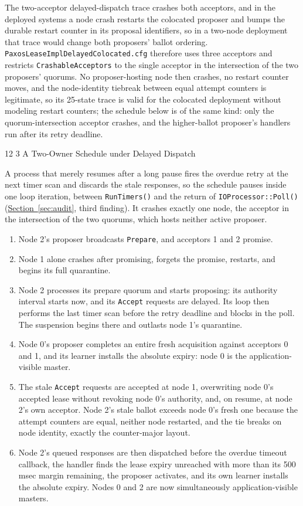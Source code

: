 \documentclass[final,5p,times,twocolumn,number]{elsarticle}
\makeatletter
\newcommand{\code}[1]{\texttt{#1}}
\newcommand{\secref}[1]{\hyperref[#1]{Section~\ref*{#1}}}
\renewcommand\subsection{\@startsection{subsection}{2}{\z@}%
           {12\p@ \@plus 6\p@ \@minus 3\p@}%
           {3\p@ \@plus 6\p@ \@minus 3\p@}%
           {\normalfont\normalsize\bfseries}}
\makeatother
\begin{document}
The two-acceptor delayed-dispatch trace crashes both acceptors, and in the deployed systems a node crash restarts the colocated proposer and bumps the durable restart counter in its proposal identifiers, so in a two-node deployment that trace would change both proposers' ballot ordering.  \code{PaxosLeaseImplDelayedColocated.cfg} therefore uses three acceptors and restricts \code{CrashableAcceptors} to the single acceptor in the intersection of the two proposers' quorums.  No proposer-hosting node then crashes, no restart counter moves, and the node-identity tiebreak between equal attempt counters is legitimate, so its 25-state trace is valid for the colocated deployment without modeling restart counters; the schedule below is of the same kind: only the quorum-intersection acceptor crashes, and the higher-ballot proposer's handlers run after its retry deadline.

\subsection{A Two-Owner Schedule under Delayed Dispatch}

A process that merely resumes after a long pause fires the overdue retry at the next timer scan and discards the stale responses, so the schedule pauses inside one loop iteration, between \code{RunTimers()} and the return of \code{IOProcessor::Poll()} (\secref{sec:audit}, third finding).  It crashes exactly one node, the acceptor in the intersection of the two quorums, which hosts neither active proposer.

\begin{enumerate}
\itemsep0.15em
\item Node 2's proposer broadcasts \code{Prepare}, and acceptors 1 and 2 promise.
\item Node 1 alone crashes after promising, forgets the promise, restarts, and begins its full quarantine.
\item Node 2 processes its prepare quorum and starts proposing: its authority interval starts now, and its \code{Accept} requests are delayed.  Its loop then performs the last timer scan before the retry deadline and blocks in the poll.  The suspension begins there and outlasts node 1's quarantine.
\item Node 0's proposer completes an entire fresh acquisition against acceptors 0 and 1, and its learner installs the absolute expiry: node 0 is the application-visible master.
\item The stale \code{Accept} requests are accepted at node 1, overwriting node 0's accepted lease without revoking node 0's authority, and, on resume, at node 2's own acceptor.  Node 2's stale ballot exceeds node 0's fresh one because the attempt counters are equal, neither node restarted, and the tie breaks on node identity, exactly the counter-major layout.
\item Node 2's queued responses are then dispatched before the overdue timeout callback, the handler finds the lease expiry unreached with more than its 500 msec margin remaining, the proposer activates, and its own learner installs the absolute expiry.  Nodes 0 and 2 are now simultaneously application-visible masters.
\end{enumerate}
\end{document}
